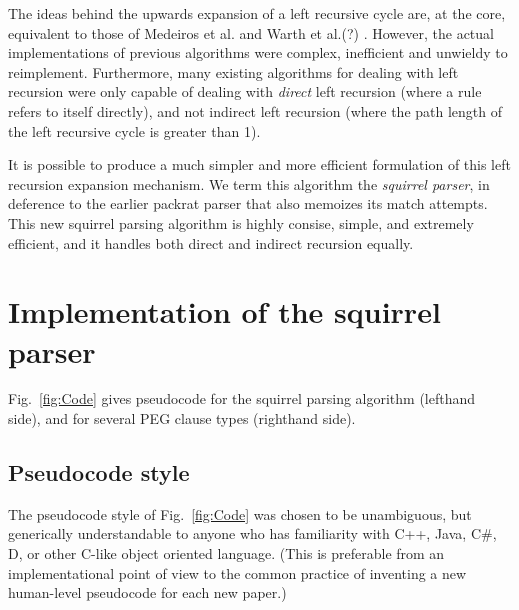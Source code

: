 \documentclass[manuscript]{acmart}
\begin{document}

The ideas behind the upwards expansion of a left recursive cycle are, at the core, equivalent to those of Medeiros et al. and Warth et al.(?) %
. However, the actual implementations of previous algorithms were complex, inefficient and unwieldy to reimplement. Furthermore, many existing algorithms for dealing with left recursion were only capable of dealing with \emph{direct} left recursion (where a rule refers to itself directly), and not indirect left recursion (where the path length of the left recursive cycle is greater than 1). %

It is possible to produce a much simpler and more efficient formulation of this left recursion expansion mechanism. We term this algorithm the \emph{squirrel parser}, in deference to the earlier packrat parser that also memoizes its match attempts. This new squirrel parsing algorithm is highly consise, simple, and extremely efficient, and it handles both direct and indirect recursion equally.

\section{Implementation of the squirrel parser}

Fig.~\ref{fig:Code} gives pseudocode for the squirrel parsing algorithm (lefthand side), and for several PEG clause types (righthand side).

\subsection{Pseudocode style}

The pseudocode style of Fig.~\ref{fig:Code} was chosen to be unambiguous, but generically understandable to anyone who has familiarity with C++, Java, C\#, D, or other C-like object oriented language. (This is preferable from an implementational point of view to the common practice of inventing a new human-level pseudocode for each new paper.)
\end{document}
